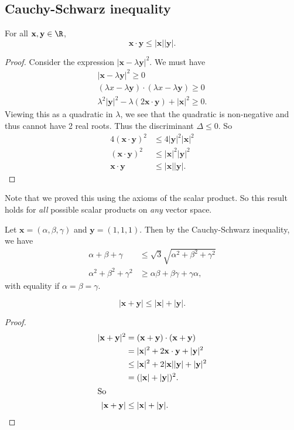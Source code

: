 \documentclass[a4paper]{article}
\begin{document}
\subsection{Cauchy-Schwarz inequality}
\begin{thm}
  For all $\mathbf{x, y}\in \R$,
  \[
    \mathbf{x\cdot y \leq |x||y|}.
  \]
\end{thm}

\begin{proof}
  Consider the expression $|\mathbf{x} - \lambda \mathbf{y}|^2$. We must have
  \begin{align*}
    |\mathbf{x} - \lambda\mathbf{y}|^2 \geq 0\\
    (\lambda{x} - \lambda\mathbf{y})\cdot (\lambda{x} - \lambda\mathbf{y}) \geq 0\\
    \lambda^2 |\mathbf{y}|^2 - \lambda (2\mathbf{x\cdot y}) + |\mathbf{x}|^2 \geq 0.
  \end{align*}
  Viewing this as a quadratic in $\lambda$, we see that the quadratic is non-negative and thus cannot have 2 real roots. Thus the discriminant $\Delta \leq 0$. So
  \begin{align*}
    4(\mathbf{x\cdot y})^2 &\leq 4|\mathbf{y}|^2|\mathbf{x}|^2\\
    (\mathbf{x\cdot y})^2 &\leq |\mathbf{x}|^2|\mathbf{y}|^2\\
    \mathbf{x\cdot y} &\leq \mathbf{|x||y|}.
  \end{align*}
\end{proof}
Note that we proved this using the axioms of the scalar product. So this result holds for \emph{all} possible scalar products on \emph{any} vector space.

\begin{eg}
  Let $\mathbf{x} = (\alpha, \beta, \gamma)$ and $\mathbf{y} = (1, 1, 1)$. Then by the Cauchy-Schwarz inequality, we have
  \begin{align*}
    \alpha + \beta + \gamma &\leq \sqrt{3}\sqrt{\alpha^2 + \beta^2 + \gamma^2}\\
    \alpha^2 + \beta^2 + \gamma^2 &\geq \alpha\beta + \beta\gamma + \gamma\alpha,
  \end{align*}
  with equality if $\alpha = \beta = \gamma$.
\end{eg}

\begin{cor}
  \[
    \mathbf{|x + y|} \leq \mathbf{|x| + |y|}.
  \]
\end{cor}
\begin{proof}
  \begin{align*}
    |\mathbf{x + y}|^2 &= \mathbf{(x + y)\cdot (x + y)}\\
    &= |\mathbf{x}|^2 + 2\mathbf{x\cdot y} + |\mathbf{y}|^2\\
    &\leq |\mathbf{x}|^2 + 2\mathbf{|x||y|} + |\mathbf{y}|^2\\
    &= (\mathbf{|x| + |y|})^2.\\
    \intertext{So}
    \mathbf{|x + y|} &\leq \mathbf{|x| + |y|}.
  \end{align*}
\end{proof}
\end{document}
